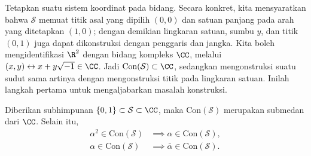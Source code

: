 Tetapkan suatu sistem koordinat pada bidang. Secara konkret, kita mensyaratkan bahwa $\mathcal{S}$ memuat titik asal yang dipilih $(0,0)$ dan satuan panjang pada arah yang ditetapkan $(1,0)$; dengan demikian lingkaran satuan, sumbu $y$, dan titik $(0,1)$ juga dapat dikonstruksi dengan penggaris dan jangka. Kita boleh mengidentifikasi $\R^2$ dengan bidang kompleks $\CC$, melalui $(x,y) \leftrightarrow x + y\sqrt{-1} \in \CC$. Jadi $\text{Con}(\mathcal{S}) \subset \CC$, sedangkan mengonstruksi suatu sudut sama artinya dengan mengonstruksi titik pada lingkaran satuan. Inilah langkah pertama untuk mengaljabarkan masalah konstruksi. 

\begin{lemma}\label{prop:ruler-compass-aux}
	Diberikan subhimpunan $\{0,1\} \subset \mathcal{S} \subset \CC$, maka $\mathrm{Con}(\mathcal{S})$ merupakan submedan dari $\CC$. Selain itu,
	\begin{align*}
		\alpha^2 \in \mathrm{Con}(\mathcal{S}) & \implies \alpha \in \mathrm{Con}(\mathcal{S}), \\
		\alpha \in \mathrm{Con}(\mathcal{S}) & \implies \bar{\alpha} \in \mathrm{Con}(\mathcal{S}).
	\end{align*}
\end{lemma}
